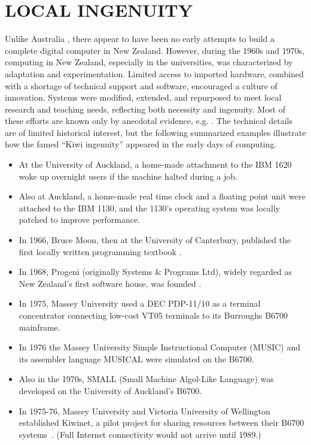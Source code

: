 \documentclass{IEEEcsmag}
\begin{document}
\vspace*{-8pt}
\section{LOCAL INGENUITY}
Unlike Australia \cite{Philipson-2017}, there appear to have been no early attempts to build a complete digital computer in New Zealand. However, during the 1960s and 1970s, computing in New Zealand, especially in the universities, was characterized by adaptation and experimentation. Limited access to imported hardware, combined with a shortage of technical support and software, encouraged a culture of innovation. Systems were modified, extended, and repurposed to meet local research and teaching needs, reflecting both necessity and ingenuity. Most of these efforts are known only by anecdotal evidence, e.g. \cite{Brownlee-private, Thomas-private}. The technical details are of limited historical interest, but the following summarized examples illustrate how the famed
“Kiwi ingenuity” \cite{ingenuity} appeared in the early days of computing.

\begin{itemize}
\item At the University of Auckland, a home-made attachment to the IBM 1620 woke up overnight users if the machine halted during a job.
\item Also at Auckland, a home-made real time clock and a floating point unit were attached to the IBM 1130, and
the 1130’s operating system was locally patched to improve performance.
\item In 1966, Bruce Moon, then at the University of Canterbury, published the first locally written programming textbook \cite{MoonProgramming}.
\item In 1968, Progeni (originally Systems \& Programs Ltd), widely regarded as New Zealand’s first software house, was founded \cite{Harpham2010}.
\item In 1975, Massey University  used a DEC PDP-11/10 as a terminal concentrator connecting low-cost VT05 terminals to its Burroughs B6700 mainframe.
\item In 1976 the Massey University Simple Instructional Computer (MUSIC) and its assembler language MUSICAL \cite{MUSIC} were simulated on the B6700.
\item Also in the 1970s, SMALL (Small Machine Algol-Like Language) was developed on the University of Auckland’s B6700. 
\item In 1975-76,  Massey University and Victoria University of Wellington established Kiwinet, a pilot project for sharing resources between their B6700 systems~\cite{ConnectingClouds}. (Full Internet connectivity would not arrive until 1989.)
\end{itemize}
\end{document}
